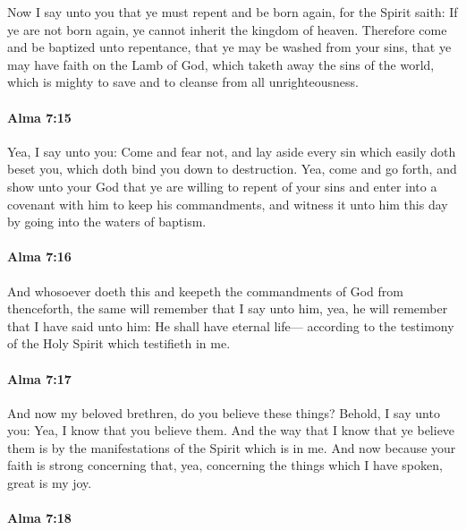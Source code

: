 			Now I say unto you
			that ye must repent and be born again,
			for the Spirit saith:
			If ye are not born again, ye cannot inherit the kingdom of heaven.
			Therefore come and be baptized unto repentance,
			that ye may be washed from your sins,
			that ye may have faith on the Lamb of God,
			which taketh away the sins of the world,
			which is mighty to save and to cleanse from all unrighteousness.

		\paragraph{Alma 7:15} %
			\label{ALMA-7-15}

			Yea, I say unto you:
			Come and fear not, and lay aside every sin which easily doth beset you,
			which doth bind you down to destruction.
			Yea, come and go forth, and show unto your God
			that ye are willing to repent of your sins
			and enter into a covenant with him to keep his commandments,
			and witness it unto him this day by going into the waters of baptism.

		\paragraph{Alma 7:16} %
			\label{ALMA-7-16}

			And whosoever doeth this
			and keepeth the commandments of God from thenceforth,
			the same will remember that I say unto him,
			yea, he will remember that I have said unto him:
			He shall have eternal life---
			according to the testimony of the Holy Spirit which testifieth in me.

		\paragraph{Alma 7:17} %
			\label{ALMA-7-17}

			And now my beloved brethren, do you believe these things?
			Behold, I say unto you:
			Yea, I know that you believe them.
			And the way that I know that ye believe them
			is by the manifestations of the Spirit which is in me.
			And now because your faith is strong concerning that,
			yea, concerning the things which I have spoken,
			great is my joy.

		\paragraph{Alma 7:18} %
			\label{ALMA-7-18}

